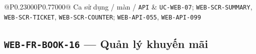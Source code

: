 \begin{longtable}{@{}P{0.23000\SRSWidth}P{0.77000\SRSWidth}@{}}
Ca sử dụng /\allowbreak{} màn /\allowbreak{} \texttt{API} & \texttt{UC-\allowbreak{}WEB-\allowbreak{}07}; \texttt{WEB-\allowbreak{}SCR-\allowbreak{}SUMMARY}, \texttt{WEB-\allowbreak{}SCR-\allowbreak{}TICKET}, \texttt{WEB-\allowbreak{}SCR-\allowbreak{}COUNTER}; \texttt{WEB-\allowbreak{}API-\allowbreak{}055}, \texttt{WEB-\allowbreak{}API-\allowbreak{}099} \\[3pt]
\end{longtable}
\endgroup

\subsection{\texttt{WEB-\allowbreak{}FR-\allowbreak{}BOOK-\allowbreak{}16} — Quản lý khuyến mãi}
\begingroup
\fontsize{9.5}{12}\selectfont
\setlength{\SRSWidth}{\dimexpr\linewidth-2\tabcolsep\relax}

